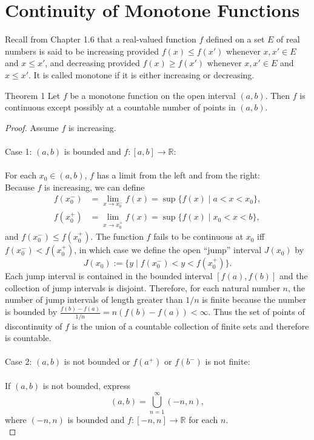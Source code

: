 \section{Continuity of Monotone Functions}
Recall from Chapter 1.6 that a real-valued function $f$ defined on a set $E$ of real numbers is said to be increasing provided $f(x)\le f(x')$ whenever $x,x'\in E$ and $x\le x'$, and decreasing provided $f(x)\ge f(x')$ whenever $x,x'\in E$ and $x\le x'$.
It is called monotone if it is either increasing or decreasing.
\begin{namedthm*}{Theorem 1}
    Let $f$ be a monotone function on the open interval $(a,b)$.
    Then $f$ is continuous except possibly at a countable number of points in $(a,b)$.
\end{namedthm*}
\begin{proof}
    Assume $f$ is increasing.\\
    \\Case 1: $(a,b)$ is bounded and $f:[a,b]\to\mathbb{R}$:\\
    \\For each $x_0\in(a,b)$, $f$ has a limit from the left and from the right:
    \\Because $f$ is increasing, we can define
    \begin{align*}
        f(x_0^-)&=\lim_{x\to x_0^-}f(x)=\sup\{f(x)\mid a<x<x_0\},\\
        f(x_0^+)&=\lim_{x\to x_0^+}f(x)=\sup\{f(x)\mid x_0<x<b\},
    \end{align*}
    and $f(x_0^-)\le f(x_0^+)$.
    The function $f$ fails to be continuous at $x_0$ iff $f(x_0^-)<f(x_0^+)$, in which case we define the open ``jump'' interval $J(x_0)$ by
    \[
        J(x_0):=\{y\mid f(x_0^-)<y<f(x_0^+)\}.
    \]
    Each jump interval is contained in the bounded interval $[f(a),f(b)]$ and the collection of jump intervals is disjoint.
    Therefore, for each natural number $n$, the number of jump intervals of length greater than $1/n$ is finite because the number is bounded by $\frac{f(b)-f(a)}{1/n}=n(f(b)-f(a))<\infty$.
    Thus the set of points of discontinuity of $f$ is the union of a countable collection of finite sets and therefore is countable.\\
    \\Case 2: $(a,b)$ is not bounded or $f(a^+)$ or $f(b^-)$ is not finite:\\
    \\If $(a,b)$ is not bounded, express
    \[
        (a,b)=\bigcup_{n=1}^\infty\left(-n,n\right),
    \]
    where $\left(-n,n\right)$ is bounded and $f:\left[-n,n\right]\to\mathbb{R}$ for each $n$.\\

\end{proof}
